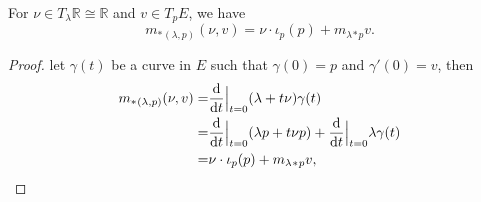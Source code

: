 \begin{lemma}\label{lem:tangent-map-of-multiplication}
    For $\nu\in T_\lambda \mathbb{R}\cong \mathbb{R}$ and $v\in T_p E$, we have 
    \begin{equation*}
        m_*{}_{(\lambda,p)}(\nu,v) = \nu\cdot\iota_p(p) + m_\lambda{}_*{}_p v.
    \end{equation*}
\end{lemma}
\begin{proof}
    let $\gamma(t)$ be a curve in $E$ such that $\gamma(0) = p$ and $\gamma'(0) = v$, then 
    \begin{align*}
        m_*{}_{(\lambda,p)}(\nu,v) =& \frac{{\rm d} }{{\rm d} t}\Big|_{t=0} (\lambda + t\nu)\gamma(t) \\
        =& \frac{{\rm d} }{{\rm d} t}\Big|_{t=0}(\lambda p + t\nu p) + \frac{{\rm d} }{{\rm d} t}\Big|_{t=0} \lambda \gamma(t) \\
        =& \nu\cdot\iota_p(p) + m_\lambda{}_*{}_p v,
    \end{align*} 
\end{proof}
